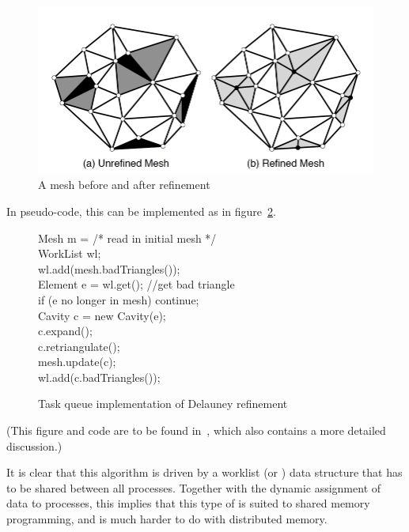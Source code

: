 \begin{figure}[ht]
\includegraphics[scale=.3]{graphics/delauney}
  \caption{A mesh before and after refinement}
  \label{fig:delauney}
\end{figure}

In pseudo-code, this can be implemented as in
figure~\ref{fig:delauney-code}.
\begin{figure}
\begin{displayalgorithm}
Mesh m = /* read in initial mesh */ \\
WorkList wl; \\
wl.add(mesh.badTriangles()); \\
 { 
Element e = wl.get(); //get bad triangle \\
if (e no longer in mesh) continue; \\
Cavity c = new Cavity(e); \\
c.expand(); \\
c.retriangulate(); \\
mesh.update(c); \\
wl.add(c.badTriangles()); \\
}
\end{displayalgorithm}
  \caption{Task queue implementation of Delauney refinement}
  \label{fig:delauney-code}
\end{figure}
(This figure and code are to be found in~\cite{Kulkami:howmuch}, 
which also contains a more detailed discussion.)


It is clear that this algorithm is driven by a worklist (or
) data structure
that has to be shared between all processes. Together with the dynamic
assignment of data to processes, this implies that this type of
 is suited to shared memory
programming, and is much harder to do with distributed memory.

